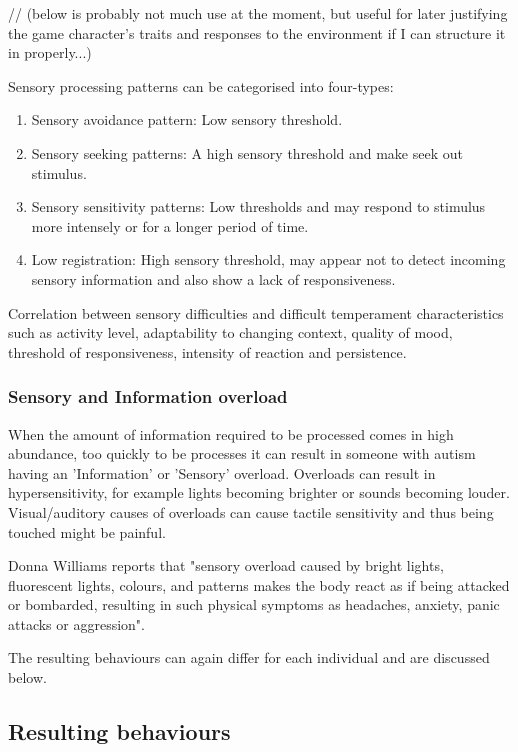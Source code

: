 \documentclass[11pt]{report}
\begin{document}
// (below is probably not much use at the moment, but useful for later justifying the game character's traits and responses to the environment if I can structure it in properly...)

Sensory processing patterns can be categorised into four-types\cite{sensory_leisure}:

\begin{enumerate}
\item Sensory avoidance pattern: Low sensory threshold. 
\item Sensory seeking patterns: A high sensory threshold and make seek out stimulus.
\item Sensory sensitivity patterns: Low thresholds and may respond to stimulus more intensely or for a longer period of time.
\item Low registration: High sensory threshold, may appear not to detect incoming sensory information and also show a lack of responsiveness.
\end{enumerate}

Correlation between sensory difficulties and difficult temperament characteristics such as activity level, adaptability to changing context, quality of mood, threshold of responsiveness, intensity of reaction and persistence\cite{temperament}. 

\subsubsection{Sensory and Information overload}

When the amount of information required to be processed comes in high abundance, too quickly to be processes it can result in someone with autism having an 'Information' or 'Sensory' overload. Overloads can result in hypersensitivity, for example lights becoming brighter or sounds becoming louder. Visual/auditory causes of overloads can cause tactile sensitivity and thus being touched might be painful. 

Donna Williams reports that "sensory overload caused by bright lights, fluorescent lights, colours, and patterns makes the body react as if being attacked or bombarded, resulting in such physical symptoms as headaches, anxiety,
panic attacks or aggression"\cite{bayes}.

The resulting behaviours can again differ for each individual and are discussed below.

\subsection{Resulting behaviours}
\end{document}
